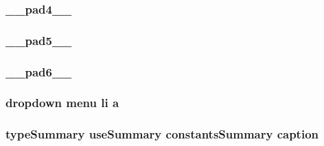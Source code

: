 \hypertarget{stylesheet_8css_a36d049b923f8c5cec553a6e1806e818a}{
\subsubsection[{\-\_\-\-\_\-pad4\-\_\-\-\_\-}]{ \-\_\-\-\_\-pad4\-\_\-\-\_\-}}\label{stylesheet_8css_a36d049b923f8c5cec553a6e1806e818a}
\hypertarget{stylesheet_8css_a399cdd17dba87ba7fd179492e8aec98b}{
\subsubsection[{\-\_\-\-\_\-pad5\-\_\-\-\_\-}]{ \-\_\-\-\_\-pad5\-\_\-\-\_\-}}\label{stylesheet_8css_a399cdd17dba87ba7fd179492e8aec98b}
\hypertarget{stylesheet_8css_ad2f2c6035f155ef0acc647320fccddb8}{
\subsubsection[{\-\_\-\-\_\-pad6\-\_\-\-\_\-}]{ \-\_\-\-\_\-pad6\-\_\-\-\_\-}}\label{stylesheet_8css_ad2f2c6035f155ef0acc647320fccddb8}
\hypertarget{stylesheet_8css_a5e8981582017bb8b84c21f148345d1f7}{
\subsubsection[{a}]{\setlength{\rightskip}{0pt plus 5cm}dropdown {\bf menu} li a}}\label{stylesheet_8css_a5e8981582017bb8b84c21f148345d1f7}
\hypertarget{stylesheet_8css_af80f57db1ff8f5d004463f9fcbf50c6f}{
\subsubsection[{caption}]{ {\bf type\-Summary} {\bf use\-Summary} {\bf constants\-Summary} caption}}\label{stylesheet_8css_af80f57db1ff8f5d004463f9fcbf50c6f}
